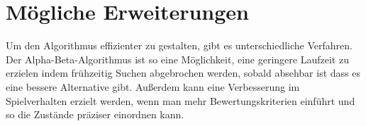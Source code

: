 
\chapter{Mögliche Erweiterungen}
\label{ch:Erweiterungen}
Um den Algorithmus effizienter zu gestalten, gibt es unterschiedliche Verfahren. Der Alpha-Beta-Algorithmus ist so eine Möglichkeit, eine geringere Laufzeit zu erzielen indem frühzeitig Suchen abgebrochen werden, sobald absehbar ist dass es eine bessere Alternative gibt.\nocite{AlphaBeta} Außerdem kann eine Verbesserung im Spielverhalten erzielt werden, wenn man mehr Bewertungskriterien einführt und so die Zustände präziser einordnen kann.
\nocite{edwards1961alpha}

